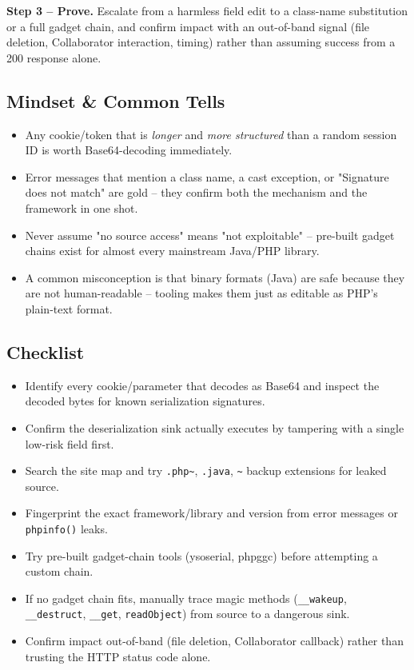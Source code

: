 \documentclass[11pt]{article}
\begin{document}
\textbf{Step 3 -- Prove.} Escalate from a harmless field edit to a class-name substitution or a full gadget chain, and confirm impact with an out-of-band signal (file deletion, Collaborator interaction, timing) rather than assuming success from a 200 response alone.

\subsection{Mindset \& Common Tells}
\begin{itemize}
    \item Any cookie/token that is \textit{longer} and \textit{more structured} than a random session ID is worth Base64-decoding immediately.
    \item Error messages that mention a class name, a cast exception, or "Signature does not match" are gold -- they confirm both the mechanism and the framework in one shot.
    \item Never assume "no source access" means "not exploitable" -- pre-built gadget chains exist for almost every mainstream Java/PHP library.
    \item A common misconception is that binary formats (Java) are safe because they are not human-readable -- tooling makes them just as editable as PHP's plain-text format.
\end{itemize}

\subsection{Checklist}
\begin{itemize}
    \item[$\square$] Identify every cookie/parameter that decodes as Base64 and inspect the decoded bytes for known serialization signatures.
    \item[$\square$] Confirm the deserialization sink actually executes by tampering with a single low-risk field first.
    \item[$\square$] Search the site map and try \verb|.php~|, \verb|.java|, \verb|~| backup extensions for leaked source.
    \item[$\square$] Fingerprint the exact framework/library and version from error messages or \texttt{phpinfo()} leaks.
    \item[$\square$] Try pre-built gadget-chain tools (ysoserial, phpggc) before attempting a custom chain.
    \item[$\square$] If no gadget chain fits, manually trace magic methods (\verb|__wakeup|, \verb|__destruct|, \verb|__get|, \texttt{readObject}) from source to a dangerous sink.
    \item[$\square$] Confirm impact out-of-band (file deletion, Collaborator callback) rather than trusting the HTTP status code alone.
\end{itemize}
\end{document}
